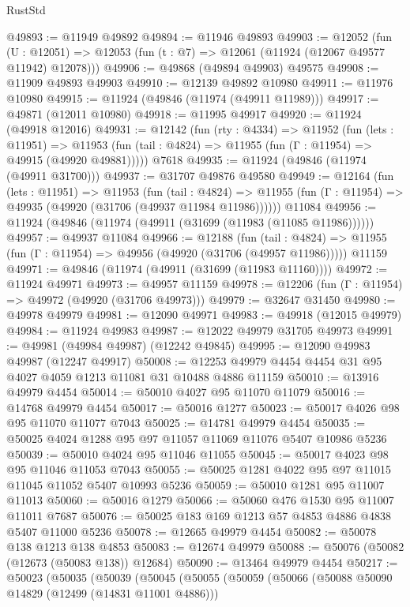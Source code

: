 \begin{lexlean}{RustStd}
\begin{coremodule}
{\begin{coremodule}
{{{{{{{{{{{{{{{{{{{{{{{{{{{{{{{{{{{{{{{{{{{{{{{{{{{{{{{{{{{{{{{{{{{{{{{{{{{{{{{{@49893 := @11949 @49892
@49894 := @11946 @49893
@49903 := @12052
    (fun (U : @12051) => @12053 (fun (t : @7) => @12061 (@11924 (@12067 @49577 @11942) @12078)))
@49906 := @49868 (@49894 @49903) @49575
@49908 := @11909 @49893 @49903
@49910 := @12139 @49892 @10980
@49911 := @11976 @10980
@49915 := @11924 (@49846 (@11974 (@49911 @11989)))
@49917 := @49871 (@12011 @10980)
@49918 := @11995 @49917
@49920 := @11924 (@49918 @12016)
@49931 := @12142
    (fun (rty : @4334) =>
    @11952
      (fun (lets : @11951) =>
      @11953 (fun (tail : @4824) => @11955 (fun (Γ : @11954) => @49915 (@49920 @49881)))))
    @7618
@49935 := @11924 (@49846 (@11974 (@49911 @31700)))
@49937 := @31707 @49876 @49580
@49949 := @12164
    (fun (lets : @11951) =>
    @11953
      (fun (tail : @4824) =>
      @11955 (fun (Γ : @11954) => @49935 (@49920 (@31706 (@49937 @11984 @11986))))))
    @11084
@49956 := @11924 (@49846 (@11974 (@49911 (@31699 (@11983 (@11085 @11986))))))
@49957 := @49937 @11084
@49966 := @12188
    (fun (tail : @4824) => @11955 (fun (Γ : @11954) => @49956 (@49920 (@31706 (@49957 @11986)))))
    @11159
@49971 := @49846 (@11974 (@49911 (@31699 (@11983 @11160))))
@49972 := @11924 @49971
@49973 := @49957 @11159
@49978 := @12206 (fun (Γ : @11954) => @49972 (@49920 (@31706 @49973)))
@49979 := @32647 @31450
@49980 := @49978 @49979
@49981 := @12090 @49971
@49983 := @49918 (@12015 @49979)
@49984 := @11924 @49983
@49987 := @12022 @49979 @31705 @49973
@49991 := @49981 (@49984 @49987) (@12242 @49845)
@49995 := @12090 @49983 @49987 (@12247 @49917)
@50008 := @12253 @49979 @4454 @4454 @31 @95 @4027 @4059 @1213 @11081 @31 @10488 @4886 @11159
@50010 := @13916 @49979 @4454
@50014 := @50010 @4027 @95 @11070 @11079
@50016 := @14768 @49979 @4454
@50017 := @50016 @1277
@50023 := @50017 @4026 @98 @95 @11070 @11077 @7043
@50025 := @14781 @49979 @4454
@50035 := @50025 @4024 @1288 @95 @97 @11057 @11069 @11076 @5407 @10986 @5236
@50039 := @50010 @4024 @95 @11046 @11055
@50045 := @50017 @4023 @98 @95 @11046 @11053 @7043
@50055 := @50025 @1281 @4022 @95 @97 @11015 @11045 @11052 @5407 @10993 @5236
@50059 := @50010 @1281 @95 @11007 @11013
@50060 := @50016 @1279
@50066 := @50060 @476 @1530 @95 @11007 @11011 @7687
@50076 := @50025 @183 @169 @1213 @57 @4853 @4886 @4838 @5407 @11000 @5236
@50078 := @12665 @49979 @4454
@50082 := @50078 @138 @1213 @138 @4853
@50083 := @12674 @49979
@50088 := @50076 (@50082 (@12673 (@50083 @138)) @12684)
@50090 := @13464 @49979 @4454
@50217 := @50023
    (@50035
      (@50039
        (@50045
          (@50055
            (@50059
              (@50066
                (@50088 @50090 @14829 (@12499 (@14831 @11001 @4886)))
}}}}}}}}}}}}}}}}}}}}}}}}}}}}}}}}}}}}}}}}}}}}}}}}}}}}}}}}}}}}}}}}}}}}}}}}}}}}}}}}
\end{coremodule}}
\end{coremodule}
\end{lexlean}
